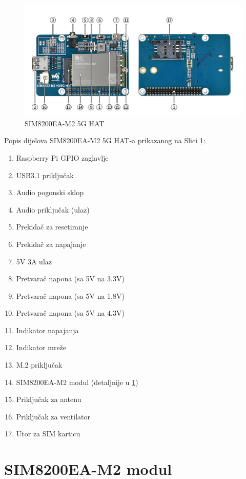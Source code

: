 \documentclass[zavrsnirad]{fer}
\begin{document}
\begin{figure}[htb]
  \centering
  \includegraphics[width=1\linewidth]{Figures/SIM8200EA-M2-5G-HAT-details-intro.jpg} 
  \caption{SIM8200EA-M2 5G HAT \cite{Waveshare}}
  \label{slk:wavesharesim8200}
\end{figure}

Popis dijelova SIM8200EA-M2 5G HAT-a prikazanog na Slici \ref{slk:wavesharesim8200}:

\begin{enumerate}
  \itemsep-0.5em
  \item Raspberry Pi GPIO zaglavlje
  \item USB3.1 priključak
  \item Audio pogonski sklop
  \item Audio priključak (ulaz)
  \item Prekidač za resetiranje
  \item Prekidač za napajanje
  \item 5V 3A ulaz
  \item Pretvarač napona (sa 5V na 3.3V)
  \item Pretvarač napona (sa 5V na 1.8V)
  \item Pretvarač napona (sa 5V na 4.3V)
  \item Indikator napajanja
  \item Indikator mreže
  \item M.2 priključak
  \item SIM8200EA-M2 modul (detaljnije u \ref{dio:sim8200eamodul})
  \item Priključak za antenu
  \item Priključak za ventilator
  \item Utor za SIM karticu
\end{enumerate}

\pagebreak

\section{SIM8200EA-M2 modul}
\label{dio:sim8200eamodul}
\end{document}
